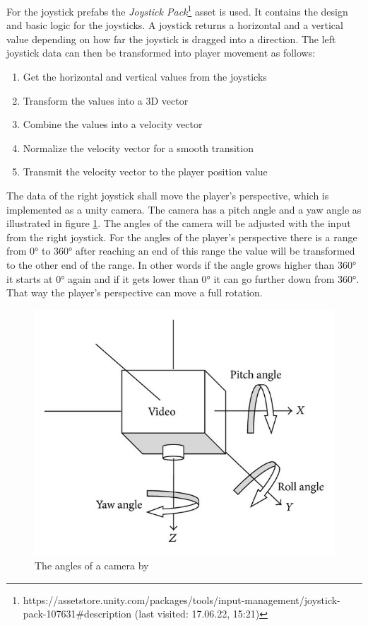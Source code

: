 For the joystick \glspl{prefab} the \textit{Joystick Pack}\footnote{https://assetstore.unity.com/packages/tools/input-management/joystick-pack-107631\#description (last visited: 17.06.22, 15:21)} \gls{asset} is used.
It contains the design and basic logic for the joysticks.
A joystick returns a horizontal and a vertical value depending on how far the joystick is dragged into a direction.
The left joystick data can then be transformed into player movement as follows:
\begin{enumerate}
    \item Get the horizontal and vertical values from the joysticks
    \item Transform the values into a 3D vector
    \item Combine the values into a velocity vector
    \item Normalize the velocity vector for a smooth transition
    \item Transmit the velocity vector to the player position value
\end{enumerate}

The data of the right joystick shall move the player's perspective, which is implemented as a \gls{unity} camera.
The camera has a pitch angle and a yaw angle as illustrated in figure \ref{fig:camera}.
The angles of the camera will be adjusted with the input from the right joystick. 
For the angles of the player's perspective there is a range from 0° to 360° after reaching an end of this range the value will be transformed to the other end of the range.
In other words if the angle grows higher than 360° it starts at 0° again and if it gets lower than 0° it can go further down from 360°.
That way the player's perspective can move a full rotation.
\begin{figure}[htb]
    \centering
    \includegraphics[width=1\textwidth]{Implementation/img/pitch_yaw.jpg}
    \caption{The angles of a camera by \cite{Zhang2014}}\label{fig:camera}
\end{figure}

